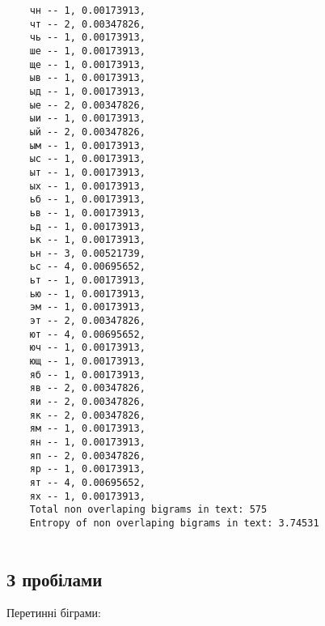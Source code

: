 \begin{verbatim}
    чн -- 1, 0.00173913,
    чт -- 2, 0.00347826,
    чь -- 1, 0.00173913,
    ше -- 1, 0.00173913,
    ще -- 1, 0.00173913,
    ыв -- 1, 0.00173913,
    ыд -- 1, 0.00173913,
    ые -- 2, 0.00347826,
    ыи -- 1, 0.00173913,
    ый -- 2, 0.00347826,
    ым -- 1, 0.00173913,
    ыс -- 1, 0.00173913,
    ыт -- 1, 0.00173913,
    ых -- 1, 0.00173913,
    ьб -- 1, 0.00173913,
    ьв -- 1, 0.00173913,
    ьд -- 1, 0.00173913,
    ьк -- 1, 0.00173913,
    ьн -- 3, 0.00521739,
    ьс -- 4, 0.00695652,
    ьт -- 1, 0.00173913,
    ью -- 1, 0.00173913,
    эм -- 1, 0.00173913,
    эт -- 2, 0.00347826,
    ют -- 4, 0.00695652,
    юч -- 1, 0.00173913,
    ющ -- 1, 0.00173913,
    яб -- 1, 0.00173913,
    яв -- 2, 0.00347826,
    яи -- 2, 0.00347826,
    як -- 2, 0.00347826,
    ям -- 1, 0.00173913,
    ян -- 1, 0.00173913,
    яп -- 2, 0.00347826,
    яр -- 1, 0.00173913,
    ят -- 4, 0.00695652,
    ях -- 1, 0.00173913,
    Total non overlaping bigrams in text: 575
    Entropy of non overlaping bigrams in text: 3.74531
    
\end{verbatim}


\subsection*{З пробілами}

Перетинні біграми:

